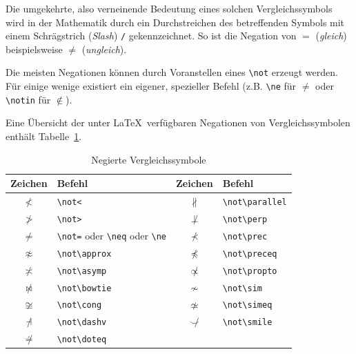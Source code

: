 \documentclass[a4paper,10pt,twoside]{scrbook}
\begin{document}
Die umgekehrte, also verneinende
Bedeutung eines solchen Vergleichssymbols wird
in der Mathematik durch ein Durchstreichen des betreffenden Symbols mit einem Schrägstrich (\textsl{Slash})
\verb!/! gekennzeichnet. So ist die Negation von \(=\) (\textsl{gleich}) 
beispielsweise \(\neq\) (\textsl{ungleich}).


Die meisten Negationen können durch Voranstellen eines 
\verb!\not!
 erzeugt werden. Für einige wenige existiert ein eigener,
spezieller Befehl (z.B. \verb!\ne! für \(\ne\) oder 
\verb!\notin!
 für \(\notin\)).

Eine Übersicht der unter \LaTeX\ verfügbaren 
Negationen von Vergleichssymbolen enthält Tabelle~\ref{Tabelle_NegierteVergleichssymbole}.


\begin{table}[h!tb]
\centering
\caption{Negierte Vergleichssymbole}
\label{Tabelle_NegierteVergleichssymbole}       %
\begin{tabular}{clcl}
\hline
Zeichen & Befehl & Zeichen & Befehl  \\
\hline
$\not<$ & \texttt{\textbackslash not<} & 
$\not\parallel$ & \texttt{\textbackslash not\textbackslash parallel}\\
$\not>$ & \texttt{\textbackslash not>} & 
$\not\perp$ & \texttt{\textbackslash not\textbackslash perp} \\
$\not=$ & \texttt{\textbackslash not=} oder \texttt{\textbackslash neq} oder \texttt{\textbackslash ne}&
$\not\prec$ & \texttt{\textbackslash not\textbackslash prec} \\
$\not\approx$ & \texttt{\textbackslash not\textbackslash approx} & 
$\not\preceq$ & \texttt{\textbackslash not\textbackslash preceq} \\
$\not\asymp$ & \texttt{\textbackslash not\textbackslash asymp} & 
$\not\propto$ & \texttt{\textbackslash not\textbackslash propto} \\
$\not\bowtie$ & \texttt{\textbackslash not\textbackslash bowtie} & 
$\not\sim$ & \texttt{\textbackslash not\textbackslash sim} \\
$\not\cong$ & \texttt{\textbackslash not\textbackslash cong} & 
$\not\simeq$ & \texttt{\textbackslash not\textbackslash simeq} \\
$\not\dashv$ & \texttt{\textbackslash not\textbackslash dashv} & 
$\not\smile$ & \texttt{\textbackslash not\textbackslash smile} \\
$\not\doteq$ & \texttt{\textbackslash not\textbackslash doteq} & 

\end{tabular}
\end{table}
\end{document}
